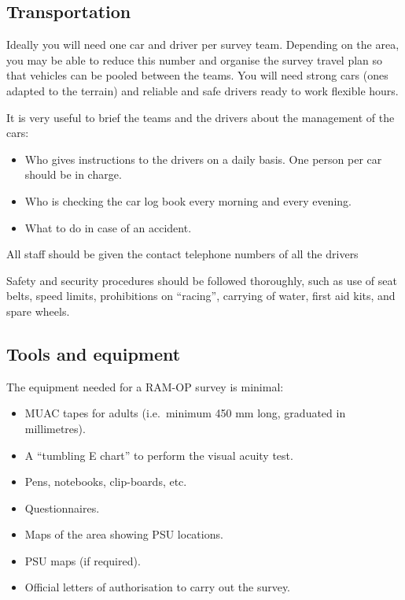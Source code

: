 \documentclass[12pt,a4paper]{book}
\providecommand{\tightlist}{%
  \setlength{\itemsep}{0pt}\setlength{\parskip}{0pt}}
\theoremstyle{definition}
\theoremstyle{definition}
\theoremstyle{definition}
\theoremstyle{remark}
\begin{document}
\hypertarget{transportation}{%
\subsection{Transportation}\label{transportation}}

Ideally you will need one car and driver per survey team. Depending on
the area, you may be able to reduce this number and organise the survey
travel plan so that vehicles can be pooled between the teams. You will
need strong cars (ones adapted to the terrain) and reliable and safe
drivers ready to work flexible hours.

It is very useful to brief the teams and the drivers about the
management of the cars:

\begin{itemize}
\tightlist
\item
  Who gives instructions to the drivers on a daily basis. One person per
  car should be in charge.
\item
  Who is checking the car log book every morning and every evening.
\item
  What to do in case of an accident.
\end{itemize}

All staff should be given the contact telephone numbers of all the
drivers

Safety and security procedures should be followed thoroughly, such as
use of seat belts, speed limits, prohibitions on ``racing'', carrying of
water, first aid kits, and spare wheels.

\hypertarget{tools-and-equipment}{%
\subsection{Tools and equipment}\label{tools-and-equipment}}

The equipment needed for a RAM-OP survey is minimal:

\begin{itemize}
\tightlist
\item
  MUAC tapes for adults (i.e.~minimum 450 mm long, graduated in
  millimetres).
\item
  A ``tumbling E chart'' to perform the visual acuity test.
\item
  Pens, notebooks, clip-boards, etc.
\item
  Questionnaires.
\item
  Maps of the area showing PSU locations.
\item
  PSU maps (if required).
\item
  Official letters of authorisation to carry out the survey.
\end{itemize}
\end{document}
